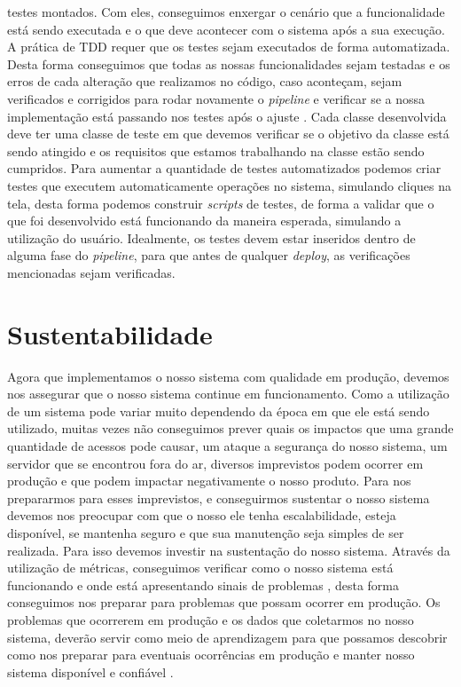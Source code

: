         testes montados. Com eles, conseguimos enxergar o cenário que a funcionalidade
        está sendo executada e o que deve acontecer com o sistema após a sua execução.
        \newline
        A prática de TDD requer que os testes sejam executados de forma automatizada.
        Desta forma conseguimos que todas as nossas funcionalidades sejam testadas
        e os erros de cada alteração que realizamos no código, caso aconteçam,
        sejam verificados e corrigidos para rodar novamente o \textit{pipeline}
        e verificar se a nossa implementação está passando nos testes após o ajuste
        \cite{ContinuousDelivery}. Cada classe desenvolvida deve ter uma classe
        de teste em que devemos verificar se o objetivo da classe está sendo atingido
        e os requisitos que estamos trabalhando na classe estão sendo cumpridos.
        Para aumentar a quantidade de testes automatizados podemos criar testes
        que executem automaticamente operações no sistema, simulando cliques na
        tela, desta forma podemos construir \textit{scripts} de testes, de forma
        a validar que o que foi desenvolvido está funcionando da maneira esperada,
        simulando a utilização do usuário. Idealmente, os testes devem estar inseridos
        dentro de alguma fase do \textit{pipeline}, para que antes de qualquer
        \textit{deploy}, as verificações mencionadas sejam verificadas. \newline

      \section{Sustentabilidade}
        Agora que implementamos o nosso sistema com qualidade em produção, devemos
        nos assegurar que o nosso sistema continue em funcionamento. Como a utilização
        de um sistema pode variar muito dependendo da época em que ele está sendo
        utilizado, muitas vezes não conseguimos prever quais os impactos que uma
        grande quantidade de acessos pode causar, um ataque a segurança do nosso
        sistema, um servidor que se encontrou fora do ar, diversos imprevistos podem
        ocorrer em produção e que podem impactar negativamente o nosso produto. \newline
        Para nos prepararmos para esses imprevistos, e conseguirmos sustentar o
        nosso sistema devemos nos preocupar com que o nosso ele tenha escalabilidade,
        esteja disponível, se mantenha seguro e que sua manutenção seja simples
        de ser realizada. Para isso devemos investir na sustentação do nosso sistema.
        Através da utilização de métricas, conseguimos verificar como o nosso sistema
        está funcionando e onde está apresentando sinais de problemas \cite{
        TheDevOpsHandbook}, desta forma conseguimos nos preparar para problemas
        que possam ocorrer em produção. Os problemas que ocorrerem em produção e
        os dados que coletarmos no nosso sistema, deverão servir como meio de
        aprendizagem para que possamos descobrir como nos preparar para eventuais
        ocorrências em produção e manter nosso sistema disponível e confiável \cite{
        SiteReliabilityEngineering}.
